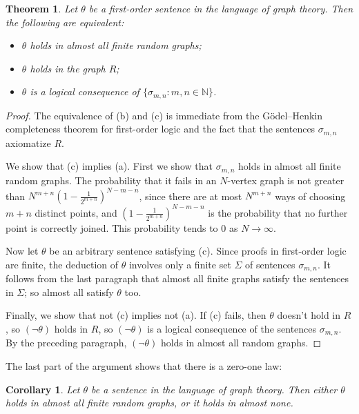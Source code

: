 \documentclass[12pt]{article}
\newtheorem{theorem}{Theorem}
\newtheorem{corollary}{Corollary}
\begin{document}
\begin{theorem}\label{ch32:them6.1} 
Let $\theta$ be a first-order sentence in the
language of graph theory. Then the following are equivalent:
\begin{itemize}
\item[(a)] $\theta$ holds in almost all finite random graphs;
\item[(b)] $\theta$ holds in the graph $R$;
\item[(c)] $\theta$ is a logical consequence of $\{\sigma_{m,n} : m, n \in \mathbb{N}\}$.
\end{itemize}
\end{theorem}
\begin{proof}
The equivalence of (b) and (c) is immediate from the
G\"{o}del--Henkin completeness theorem for first-order logic and the
fact that the sentences $\sigma_{m,n}$ axiomatize $R$.

We show that (c) implies (a). First we show that $\sigma_{m,n}$
holds in almost all finite random graphs. The probability that it
fails in an $N$-vertex graph is not greater than $N^{m+n}(1 -
\frac{1}{2^{m+n}})^{N - m- n}$, since there are at most $N^{ m +n}$
ways of choosing $m + n$ distinct points, and $(1 -
\frac{1}{2^{m+n}})^{N - m- n}$ is the probability that no further
point is correctly joined. This probability tends to $0$ as $N
\rightarrow \infty$.

Now let $\theta$ be an arbitrary sentence satisfying (c). Since
proofs in first-order logic are finite, the deduction of $\theta$
involves only a finite set $\Sigma$ of sentences $\sigma_{m,n}$. It
follows from the last paragraph that almost all finite graphs
satisfy the sentences in $\Sigma$; so almost all satisfy $\theta$
too.

Finally, we show that not (c) implies not (a). If (c) fails, then
$\theta$ doesn't hold in $R$, so $(\neg \theta)$ holds in $R$, so
$(\neg \theta)$ is a logical consequence of the sentences
$\sigma_{m,n}$. By the preceding paragraph, $(\neg \theta)$ holds in
almost all random graphs.
\end{proof}

The last part of the argument shows that there is a zero-one law:

\begin{corollary}\label{ch32:coro6.1} 
Let $\theta$ be a sentence in the language of
graph theory. Then either $\theta$ holds in almost all finite random
graphs, or it holds in almost none.
\end{corollary}
\end{document}
